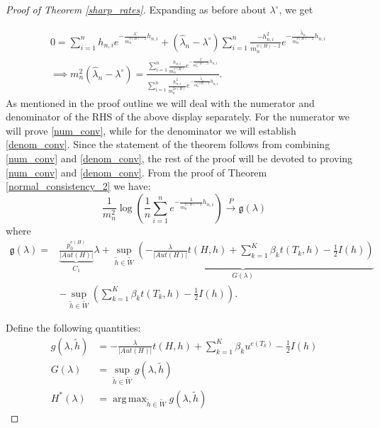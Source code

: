 \documentclass[12pt]{article}
\DeclareMathOperator*{\argmax}{arg\,max}
\numberwithin{equation}{section}
\begin{document}
\begin{proof}[Proof of Theorem \ref{sharp_rates}]



Expanding as before about $\lambda^{\circ}$, we get

\begin{align*}
&0 = \sum\limits_{i=1}^{n} h_{n,i} e^{-\frac{\lambda^{\circ}}{m_n^{v(H)-2}}h_{n,i}} + (\hat{\lambda}_n - \lambda^{\circ})\sum\limits_{i=1}^{n} \frac{-h_{n,i}^2}{m_n^{v(H)-2}}e^{-\frac{\tilde{\lambda}_n}{m_n^{v(H)-2}}h_{n,i}}\\
&\implies m_n^2(\hat{\lambda}_n - \lambda^{\circ}) = \frac{\sum\limits_{i=1}^{n}\frac{h_{n,i}}{m_n^{v(H)}}e^{-\frac{\lambda^{\circ}}{m_n^{v(H)-2}}h_{n,i}}}{\sum\limits_{i=1}^{n}\frac{h_{n,i}^2}{m_n^{2v(H)}}e^{-\frac{\tilde{\lambda}_n}{m_n^{v(H)-2}}h_{n,i}} }.
\end{align*}
As mentioned in the proof outline we will deal with the numerator and denominator of the RHS of the above display separately. For the numerator we will prove \eqref{num_conv}, while for the denominator we will establish \eqref{denom_conv}. Since the statement of the theorem follows from combining \eqref{num_conv} and \eqref{denom_conv}, the rest of the proof will be devoted to proving \eqref{num_conv} and \eqref{denom_conv}. From the proof of Theorem \ref{normal_consistency_2} we have:
\begin{equation}\frac{1}{m_n^2}\log(\frac{1}{n}\sum_{i=1}^n e^{-\frac{\lambda}{m_n^{v(H)-2}} h_{n,i}})\xrightarrow{P}\mathfrak{g}(\lambda)\label{scaled_part_conv_1}\end{equation}
where 
\begin{align*} \mathfrak{g}(\lambda) = &  \underbrace{\frac{p_0^{e(H)}}{\lvert Aut(H)\rvert}}_{C_1}\lambda  + \underbrace{\sup_{\tilde{h}\in\tilde{W}}\left(-\frac{\lambda}{\lvert Aut(H)\rvert} t(H,h) + \sum_{k=1}^K \beta_k t(T_k, h)-\frac{1}{2} I (h)\right)}_{G(\lambda)}\\
&- \sup_{\tilde{h}\in\tilde{W}}\left(\sum_{k=1}^K \beta_k t(T_k, h) -\frac{1}{2} I (h)\right).
\end{align*}

Define the following quantities:
\begin{align*}
    g(\lambda, \tilde{h}) &= -\frac{\lambda}{\lvert Aut(H)\rvert} t(H,h) + \sum_{k=1}^K \beta_k u^{e(T_k)} -\frac{1}{2} I (h)\\
    G(\lambda) &= \sup_{\tilde{h}\in\tilde{W}} g(\lambda, \tilde{h})\\
    H^*(\lambda) & = \argmax_{\tilde{h}\in\tilde{W}} g(\lambda, \tilde{h})
\end{align*}


\end{proof}
\end{document}

